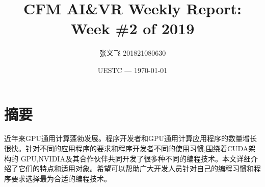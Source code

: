 \documentclass{article}
\title{CFM AI\&VR Weekly Report: Week \#2 of 2019}
\author{张义飞 201821080630}
\date{UESTC --- \today}
\begin{document}
    
    \maketitle

    \section{摘要}

近年来GPU通用计算蓬勃发展。程序开发者和GPU通用计算应用程序的数量增长很快。针对不同的应用程序的要求和程序开发者不同的使用习惯,围绕着CUDA架构的 GPU,NVIDIA及其合作伙伴共同开发了很多种不同的编程技术。本文详细介绍了它们的特点和适用对象。希望可以帮助广大开发人员针对自己的编程习惯和程序要求选择最为合适的编程技术。
    
\end{document}
